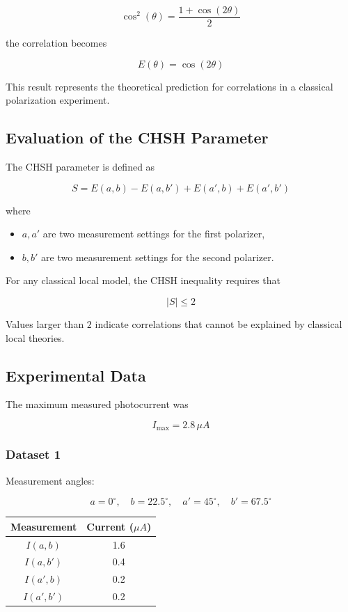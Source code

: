 \documentclass[17pt,a4paper]{extarticle}
\begin{document}
\[
\cos^2(\theta) = \frac{1+\cos(2\theta)}{2}
\]

the correlation becomes

\[
E(\theta) = \cos(2\theta)
\]

This result represents the theoretical prediction for correlations in a classical polarization experiment.

\subsection{Evaluation of the CHSH Parameter}

The CHSH parameter is defined as

\[
S = E(a,b) - E(a,b') + E(a',b) + E(a',b')
\]

where

\begin{itemize}
\item $a, a'$ are two measurement settings for the first polarizer,
\item $b, b'$ are two measurement settings for the second polarizer.
\end{itemize}

For any classical local model, the CHSH inequality requires that

\[
|S| \le 2
\]

Values larger than $2$ indicate correlations that cannot be explained by classical local theories.

\subsection{Experimental Data}

The maximum measured photocurrent was

\[
I_{\text{max}} = 2.8\,\mu A
\]

\subsubsection{Dataset 1}

Measurement angles:

\[
a = 0^\circ, \quad b = 22.5^\circ, \quad a' = 45^\circ, \quad b' = 67.5^\circ
\]

\begin{table}[h]
\centering
\begin{tabular}{c c}
Measurement & Current ($\mu A$) \\
\hline
$I(a,b)$ & 1.6 \\
$I(a,b')$ & 0.4 \\
$I(a',b)$ & 0.2 \\
$I(a',b')$ & 0.2 \\
\end{tabular}
\end{table}
\end{document}
